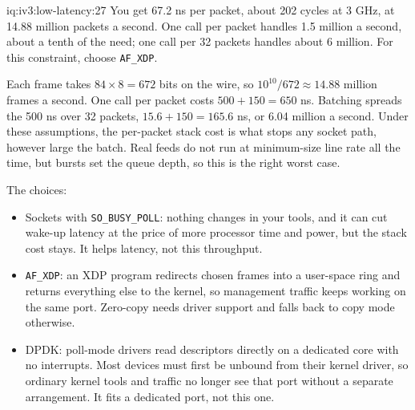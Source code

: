 \begin{solution}{iq:iv3:low-latency:27}
You get 67.2 ns per packet, about 202 cycles at 3 GHz, at 14.88 million packets a second. One call per packet handles 1.5 million a second, about a tenth of the need; one call per 32 packets handles about 6 million. For this constraint, choose \texttt{AF\_XDP}.

Each frame takes $84 \times 8 = 672$ bits on the wire, so $10^{10} / 672 \approx 14.88$ million frames a second. One call per packet costs $500 + 150 = 650$ ns. Batching spreads the 500 ns over 32 packets, $15.6 + 150 = 165.6$ ns, or 6.04 million a second. Under these assumptions, the per-packet stack cost is what stops any socket path, however large the batch. Real feeds do not run at minimum-size line rate all the time, but bursts set the queue depth, so this is the right worst case.

The choices:
\begin{itemize}
\item Sockets with \texttt{SO\_BUSY\_POLL}: nothing changes in your tools, and it can cut wake-up latency at the price of more processor time and power, but the stack cost stays. It helps latency, not this throughput.
\item \texttt{AF\_XDP}: an XDP program redirects chosen frames into a user-space ring and returns everything else to the kernel, so management traffic keeps working on the same port. Zero-copy needs driver support and falls back to copy mode otherwise.
\item DPDK: poll-mode drivers read descriptors directly on a dedicated core with no interrupts. Most devices must first be unbound from their kernel driver, so ordinary kernel tools and traffic no longer see that port without a separate arrangement. It fits a dedicated port, not this one.
\end{itemize}

\end{solution}

